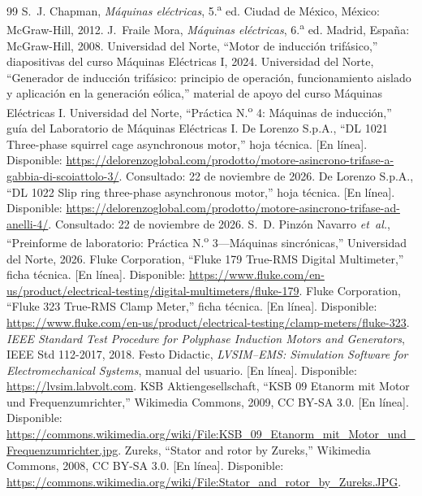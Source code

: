 \documentclass[conference]{IEEEtran}
\begin{document}
\begin{thebibliography}{99}
 S.~J. Chapman, \emph{Máquinas eléctricas}, 5.\textsuperscript{a} ed. Ciudad de México, México: McGraw-Hill, 2012.
 J.~Fraile Mora, \emph{Máquinas eléctricas}, 6.\textsuperscript{a} ed. Madrid, España: McGraw-Hill, 2008.
 Universidad del Norte, ``Motor de inducción trifásico,'' diapositivas del curso Máquinas Eléctricas I, 2024.
 Universidad del Norte, ``Generador de inducción trifásico: principio de operación, funcionamiento aislado y aplicación en la generación eólica,'' material de apoyo del curso Máquinas Eléctricas I.
 Universidad del Norte, ``Práctica N.\textsuperscript{o} 4: Máquinas de inducción,'' guía del Laboratorio de Máquinas Eléctricas I.
 De Lorenzo S.p.A., ``DL 1021 Three-phase squirrel cage asynchronous motor,'' hoja técnica. [En línea]. Disponible: \url{https://delorenzoglobal.com/prodotto/motore-asincrono-trifase-a-gabbia-di-scoiattolo-3/}. Consultado: 22 de noviembre de 2026.
 De Lorenzo S.p.A., ``DL 1022 Slip ring three-phase asynchronous motor,'' hoja técnica. [En línea]. Disponible: \url{https://delorenzoglobal.com/prodotto/motore-asincrono-trifase-ad-anelli-4/}. Consultado: 22 de noviembre de 2026.
 S.~D. Pinzón Navarro \emph{et~al.}, ``Preinforme de laboratorio: Práctica N.\textsuperscript{o} 3---Máquinas sincrónicas,'' Universidad del Norte, 2026.
 Fluke Corporation, ``Fluke 179 True-RMS Digital Multimeter,'' ficha técnica. [En línea]. Disponible: \url{https://www.fluke.com/en-us/product/electrical-testing/digital-multimeters/fluke-179}.
 Fluke Corporation, ``Fluke 323 True-RMS Clamp Meter,'' ficha técnica. [En línea]. Disponible: \url{https://www.fluke.com/en-us/product/electrical-testing/clamp-meters/fluke-323}.
 \emph{IEEE Standard Test Procedure for Polyphase Induction Motors and Generators}, IEEE Std 112-2017, 2018.
 Festo Didactic, \emph{LVSIM--EMS: Simulation Software for Electromechanical Systems}, manual del usuario. [En línea]. Disponible: \url{https://lvsim.labvolt.com}.
 KSB Aktiengesellschaft, ``KSB 09 Etanorm mit Motor und Frequenzumrichter,'' Wikimedia Commons, 2009, CC BY-SA 3.0. [En línea]. Disponible: \url{https://commons.wikimedia.org/wiki/File:KSB_09_Etanorm_mit_Motor_und_Frequenzumrichter.jpg}.
 Zureks, ``Stator and rotor by Zureks,'' Wikimedia Commons, 2008, CC BY-SA 3.0. [En línea]. Disponible: \url{https://commons.wikimedia.org/wiki/File:Stator_and_rotor_by_Zureks.JPG}.
\end{thebibliography}
\end{document}
